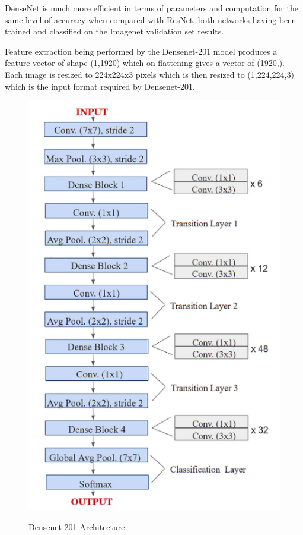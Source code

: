 \documentclass[ 12pt,a4paper,twocolumn,fleqn]{article}
\begin{document}
\begin{adjustwidth}{3.5em}{0pt}
DenseNet is much more efficient in terms of parameters and computation for the same level of accuracy when compared with ResNet, both networks having been trained and classified on the Imagenet validation set results.

\hspace{0.2cm}

Feature extraction being performed by the Densenet-201 model produces a feature vector of shape (1,1920) which on flattening gives a vector of (1920,). Each image is resized to 224x224x3 pixels which is then resized to (1,224,224,3) which is the input format required by Densenet-201.

\begin{figure}[H]
\begin{center}
    \hspace*{0.4in}
    \includegraphics[scale=0.7]{media/dense_arch.png}
    \\
    \centering
  \caption{ Densenet 201 Architecture}
\end{center}
\end{figure}



\end{adjustwidth}
\end{document}

